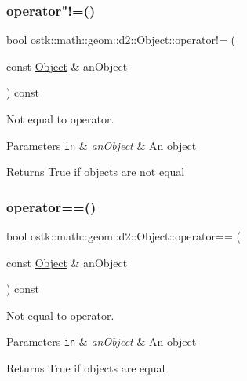 \subsubsection{\texorpdfstring{operator"!=()}{operator!=()}}
{\footnotesize\ttfamily bool ostk\+::math\+::geom\+::d2\+::\+Object\+::operator!= (\begin{DoxyParamCaption}\item[{const \hyperlink{classostk_1_1math_1_1geom_1_1d2_1_1_object}{Object} \&}]{an\+Object }\end{DoxyParamCaption}) const}



Not equal to operator. 


\begin{DoxyParams}[1]{Parameters}
\mbox{\tt in}  & {\em an\+Object} & An object \\
\hline
\end{DoxyParams}
\begin{DoxyReturn}{Returns}
True if objects are not equal 
\end{DoxyReturn}
\mbox{\label{classostk_1_1math_1_1geom_1_1d2_1_1_object_aa26e3719b4b10fc5c65d047a91cf0f51}} 
\subsubsection{\texorpdfstring{operator==()}{operator==()}}
{\footnotesize\ttfamily bool ostk\+::math\+::geom\+::d2\+::\+Object\+::operator== (\begin{DoxyParamCaption}\item[{const \hyperlink{classostk_1_1math_1_1geom_1_1d2_1_1_object}{Object} \&}]{an\+Object }\end{DoxyParamCaption}) const}



Not equal to operator. 


\begin{DoxyParams}[1]{Parameters}
\mbox{\tt in}  & {\em an\+Object} & An object \\
\hline
\end{DoxyParams}
\begin{DoxyReturn}{Returns}
True if objects are equal 
\end{DoxyReturn}
\mbox{\label{classostk_1_1math_1_1geom_1_1d2_1_1_object_ae05ad883ed5a560e38f0aae7a4adc1ea}} 
